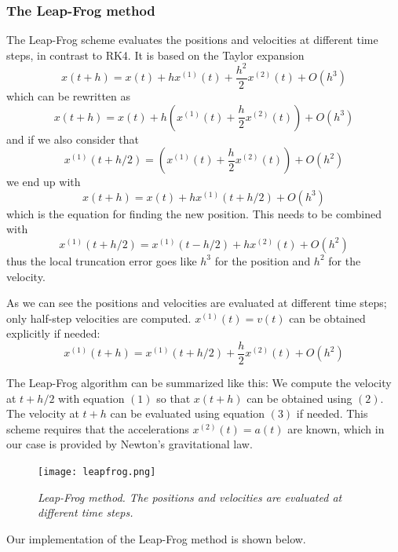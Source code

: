 \documentclass[a4paper,12pt, english]{article}
\begin{document}
\subsubsection*{The Leap-Frog method}

The Leap-Frog scheme evaluates the positions and velocities at different time steps, in contrast to RK4. It is based on the Taylor expansion
\[
x(t+h) = x(t) + hx^{(1)}(t) + \frac{h^2}{2}x^{(2)}(t) + O(h^3)
\]
which can be rewritten as
\[
x(t+h) = x(t) + h \left( x^{(1)}(t) + \frac{h}{2}x^{(2)}(t) \right) + O(h^3)
\]
and if we also consider that
\[
x^{(1)}(t+h/2) = \left( x^{(1)}(t) + \frac{h}{2}x^{(2)}(t) \right) + O(h^2)
\]
we end up with
\[
x(t+h) = x(t) + hx^{(1)}(t+h/2) + O(h^3) \tag{1}
\]
which is the equation for finding the new position. This needs to be combined with
\[
x^{(1)}(t+h/2) = x^{(1)}(t-h/2) + hx^{(2)}(t) + O(h^2) \tag{2}
\]
thus the local truncation error goes like $h^3$ for the position and $h^2$ for the velocity.

As we can see the positions and velocities are evaluated at different time steps; only half-step velocities are computed. $x^{(1)}(t) = v(t)$ can be obtained explicitly if needed:
\[
x^{(1)}(t+h) = x^{(1)}(t+h/2) + \frac{h}{2}x^{(2)}(t) + O(h^2) \tag{3}
\]

The Leap-Frog algorithm can be summarized like this: We compute the velocity at $t+h/2$ with equation $(1)$ so that $x(t+h)$ can be obtained using $(2)$. The velocity at $t+h$ can be evaluated using equation $(3)$ if needed. This scheme requires that the accelerations $x^{(2)}(t) = a(t)$ are known, which in our case is provided by Newton's gravitational law.

\begin{figure}[H]
  \centering \texttt{[image: leapfrog.png]}
  \caption{\textit{Leap-Frog method. The positions and velocities are evaluated at different time steps.}}
\end{figure}

Our implementation of the Leap-Frog method is shown below.
\end{document}
